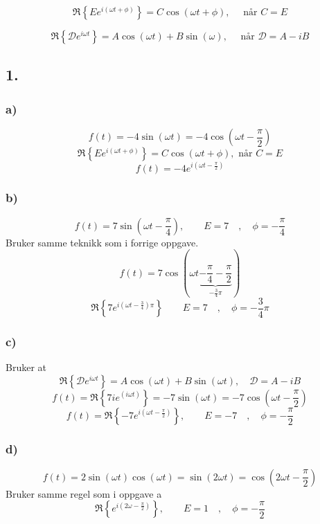 \documentclass{article}
\begin{document}
\begin{equation}\label{eq: con_3}
  \mathfrak{R} \left\{ E e^{i(ωt + ϕ)} \right\} = C \cos (ωt + ϕ), \quad \text{ når } C = E
\end{equation}

\begin{equation}\label{eq: con_4}
  \mathfrak{R} \left\{ 𝒟 e^{iωt} \right\} = A \cos (ωt) + B\sin (ω), \quad \text{ når } 𝒟 = A - iB
\end{equation}
\subsection*{1.}
\subsubsection*{a)}
\[
f(t) = -4\sin (ωt) = -4 \cos(ωt - \frac{\pi}{2})
\]
\[
\mathfrak{R} \left\{ E e^{i(ωt + ϕ)} \right\} = C \cos (ωt + ϕ), \text{ når } C = E
\]
\[
f(t) = -4 e^{i \left( ωt - \frac{π}{2} \right) }
\]
\subsubsection*{b)}
\[
f(t) = 7 \sin \left( ωt - \frac{π}{4} \right) , \qquad E = 7 \quad , \quad ϕ = - \frac{π}{4}
\]
Bruker samme teknikk som i forrige oppgave. 
\[
f(t) = 7 \cos  \left( ωt \underbrace{- \frac{π}{4} - \frac{π}{2}}_{-\frac{3}{4}π} \right)
\]
\[
\mathfrak{R} \left\{ 7 e^{i\left( ωt - \frac{3}{4} \right) π} \right\} \qquad E = 7 \quad , \quad ϕ = - \frac{3}{4}π
\]
\subsubsection*{c)}
Bruker at 
\[
\mathfrak{R} \left\{ 𝒟 e^{iωt} \right\} = A\cos (ωt) + B\sin (ωt) , \quad 𝒟 = A - iB 
\]
\[
f(t) = \mathfrak{R} \left\{ 7ie^{\left( iωt \right) } \right\} = -7\sin (ωt) = -7\cos (ωt - \frac{π}{2}) 
\]
\[
f(t) = \mathfrak{R} \left\{ -7e^{i \left( ωt - \frac{π}{2} \right) } \right\} , \qquad E = -7 \quad , \quad ϕ = - \frac{π}{2}
\]

\subsubsection*{d)}
\[
f(t) = 2 \sin (ωt) \cos (ωt) = \sin (2ωt) = \cos \left( 2ωt - \frac{π}{2} \right)
\]
Bruker samme regel som i oppgave a
\[
\mathfrak{R} \left\{ e^{i \left( 2ω - \frac{π}{2} \right) } \right\}, \qquad E = 1 \quad , \quad ϕ = - \frac{π}{2}
\]
\end{document}

